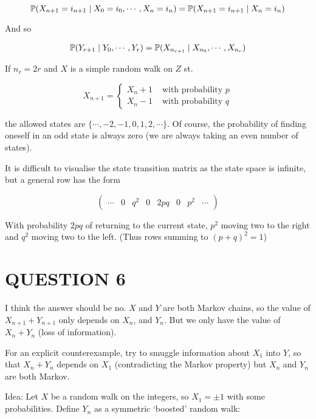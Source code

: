 \documentclass[a4paper]{article}
\begin{document}
\[ \P( X_{n+1} = i_{n+1} \; | \; X_{0} = i_{0}, \cdots, X_{n} = i_{n} ) = \P(X_{n+1} = i_{n+1} \; | \; X_{n} = i_{n} ) \]

And so

\begin{align*}
\P(Y_{r+1}  \; | \; Y_{0},\cdots,Y_{r} ) & = \P(X_{n_{r+1}} \; | \; X_{n_{0}},\cdots,X_{n_{r}}  ) \\
\end{align*}

If $ n_{r} = 2r $ and $ X $ is a simple random walk on $ Z $ st. 

\[ X_{n+1} = \begin{cases} X_{n} + 1 & \text{ with probability } p \\ X_{n} - 1 & \text{ with probability } q \end{cases} \] 

the allowed states are $ \{ \cdots,-2,-1,0,1,2,\cdots \} $. Of course, the probability of finding oneself in an odd state is always zero (we are always taking an even number of states).

It is difficult to visualise the state transition matrix as the state space is infinite, but a general row has the form

\[ \begin{pmatrix}
\cdots & 0 & q^{2} & 0 & 2pq & 0 & p^{2} & \cdots
\end{pmatrix} \]

With probability $ 2pq $ of returning to the current state, $ p^{2} $ moving two to the right and $ q^{2} $ moving two to the left. (Thus rows summing to $ (p + q)^{2} = 1 $)




\section{QUESTION 6}

I think the answer should be no. $ X $ and $ Y $ are both Markov chains, so the value of $ X_{n+1} + Y_{n+1} $ only depends on $ X_{n} $, and $ Y_{n} $. But we only have the value of $ X_{n} + Y_{n} $ (loss of information).

For an explicit counterexample, try to smuggle information about $ X_{1} $ into $ Y $, so that $ X_{n} + Y_{n} $ depends on $ X_{1} $ (contradicting the Markov property) but $ X_{n} $ and $ Y_{n} $ are both Markov.

Idea: Let $ X $ be a random walk on the integers, so $ X_{1} = \pm 1 $ with some probabilities. Define $ Y_{n} $ as a symmetric `boosted' random walk:
                                      
\end{document}
